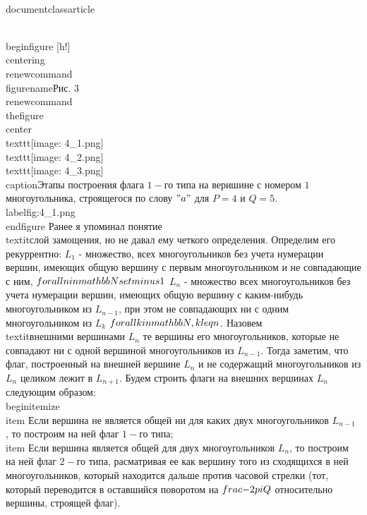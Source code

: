\\documentclass{article}
\begin{document}
\\begin{figure} [h!]
    \\centering
    \\renewcommand{\\figurename}{Рис. 3}
    \\renewcommand{\\thefigure}{}
    \\center{\\texttt{[image: 4\_1.png]} \\texttt{[image: 4\_2.png]} \\texttt{[image: 4\_3.png]}}
    \\caption{Этапы построения флага $1-$го типа на веришине с номером $1$ многоугольника, строящегося по слову $"a"$ для $P=4$ и $Q=5$.}
    \\label{fig:4_1.png}
\\end{figure}
Ранее я упоминал понятие \\textit{слой замощения}, но не давал ему четкого определения. Определим его рекуррентно: $L_{1}$ - множество, всех многоугольников без учета нумерации вершин, имеющих общую вершину с первым многоугольником и не совпадающие с ним, $\\forall n \\in \\mathbb{N}\\setminus \\{1\\} $ $L_{n}$ - множество всех многоугольников без учета нумерации вершин, имеющих общую вершину с каким-нибудь многоугольником из $L_{n-1}$, при этом не совпадающих ни с одним многоугольником из $L_{k}$ $\\forall k \\in \\mathbb{N}, k \\leq n$. Назовем \\textit{внешними} вершинами $L_{n}$ те вершины его многоугольников, которые не совпадают ни с одной вершиной многоугольников из $L_{n-1}$. Тогда заметим, что флаг, построенный на внешней вершине $L_{n}$ и не содержащий многоугольников из $L_{n}$ целиком лежит в $L_{n+1}$. Будем строить флаги на внешних вершинах $L_{n}$ следующим образом: 
\\begin{itemize}
    \\item Если вершина не является общей ни для каких двух многоугольников $L_{n-1}$ , то построим на ней флаг $1-$го типа;
    \\item Если вершина является общей для двух многоугольников $L_{n}$, то построим на ней флаг $2-$го типа, расматривая ее как вершину того из сходящихся в ней многоугольников, который находится дальше против часовой стрелки (тот, который переводится в оставшийся поворотом на $\\frac{-2\\pi}{Q}$ относительно вершины, строящей флаг).
\end{document}
